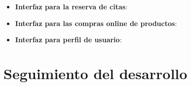 \begin{itemize}
\begin{itemize}
                \item \textbf{Interfaz para la reserva de citas}:

                \item \textbf{Interfaz para las compras online de productos}:

                \item \textbf{Interfaz para perfil de usuario}:
            \end{itemize}
\end{itemize}
\section{Seguimiento del desarrollo}
